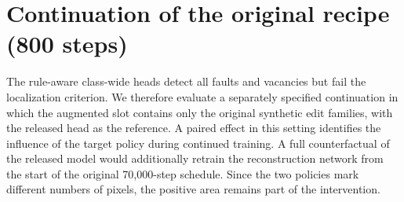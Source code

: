 \section{Continuation of the original recipe (800 steps)}
\label{sec:upstream_supp}
The rule-aware class-wide heads detect all faults and vacancies but fail the localization criterion. We therefore evaluate a separately specified continuation in which the augmented slot contains only the original synthetic edit families, with the released head as the reference. A paired effect in this setting identifies the influence of the target policy during continued training. A full counterfactual of the released model would additionally retrain the reconstruction network from the start of the original 70,000-step schedule. Since the two policies mark different numbers of pixels, the positive area remains part of the intervention.


\begin{table}[t]
\centering
\caption{Upstream-only continuation on extracted maps. The original SALAD-style augmentations are used without explicit relocation targets from the pushpin rule. Scene alarms and spatial metrics have the same definitions as the main table.}
\label{tab:upstream_e}
\small
\setlength{\tabcolsep}{4pt}

\end{table}

\begin{table}[t]
\centering
\caption{Upstream-only continuation on oracle labels. The released oracle path is shown for comparison.}
\label{tab:upstream_o}
\small
\setlength{\tabcolsep}{4pt}

\end{table}

\begin{table}[t]
\centering
\caption{Paired differences in the upstream-only continuation. Untouched compartments per fault and percentage-point differences at pre-specified cutoffs.}
\label{tab:upstream_diff}
\small

\end{table}

\begin{table}[t]
\centering
\caption{Upstream-only alternate operating points. Recalls and region area in percent. Counts are compartments per photo. The released 99th percentile, 95th percentile and reconstruction product results appear in \cref{tab:operating_v3}.}
\label{tab:upstream_alt}
\scriptsize
\setlength{\tabcolsep}{3pt}

\end{table}

